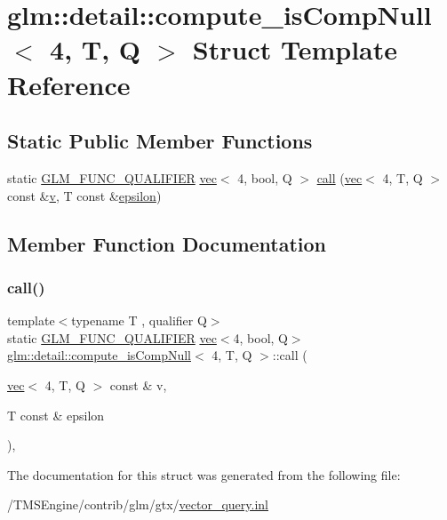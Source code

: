 \hypertarget{structglm_1_1detail_1_1compute__is_comp_null_3_014_00_01_t_00_01_q_01_4}{}\section{glm\+:\+:detail\+:\+:compute\+\_\+is\+Comp\+Null$<$ 4, T, Q $>$ Struct Template Reference}
\label{structglm_1_1detail_1_1compute__is_comp_null_3_014_00_01_t_00_01_q_01_4}
\subsection*{Static Public Member Functions}
\begin{DoxyCompactItemize}
\item 
static \hyperlink{setup_8hpp_a33fdea6f91c5f834105f7415e2a64407}{G\+L\+M\+\_\+\+F\+U\+N\+C\+\_\+\+Q\+U\+A\+L\+I\+F\+I\+ER} \hyperlink{structglm_1_1vec}{vec}$<$ 4, bool, Q $>$ \hyperlink{structglm_1_1detail_1_1compute__is_comp_null_3_014_00_01_t_00_01_q_01_4_aff1dc41c1dcdc2849505c73ec3d392ac}{call} (\hyperlink{structglm_1_1vec}{vec}$<$ 4, T, Q $>$ const \&\hyperlink{_s_d_l__opengl_8h_a10a82eabcb59d2fcd74acee063775f90}{v}, T const \&\hyperlink{group__gtc__constants_ga2a1e57fc5592b69cfae84174cbfc9429}{epsilon})
\end{DoxyCompactItemize}


\subsection{Member Function Documentation}
\mbox{\label{structglm_1_1detail_1_1compute__is_comp_null_3_014_00_01_t_00_01_q_01_4_aff1dc41c1dcdc2849505c73ec3d392ac}} 
\subsubsection{\texorpdfstring{call()}{call()}}
{\footnotesize\ttfamily template$<$typename T , qualifier Q$>$ \\
static \hyperlink{setup_8hpp_a33fdea6f91c5f834105f7415e2a64407}{G\+L\+M\+\_\+\+F\+U\+N\+C\+\_\+\+Q\+U\+A\+L\+I\+F\+I\+ER} \hyperlink{structglm_1_1vec}{vec}$<$4, bool, Q$>$ \hyperlink{structglm_1_1detail_1_1compute__is_comp_null}{glm\+::detail\+::compute\+\_\+is\+Comp\+Null}$<$ 4, T, Q $>$\+::call (\begin{DoxyParamCaption}\item[{\hyperlink{structglm_1_1vec}{vec}$<$ 4, T, Q $>$ const \&}]{v,  }\item[{T const \&}]{epsilon }\end{DoxyParamCaption})\hspace{0.3cm}{\ttfamily [inline]}, {\ttfamily [static]}}



The documentation for this struct was generated from the following file\+:\begin{DoxyCompactItemize}
\item 
/\+T\+M\+S\+Engine/contrib/glm/gtx/\hyperlink{vector__query_8inl}{vector\+\_\+query.\+inl}\end{DoxyCompactItemize}
